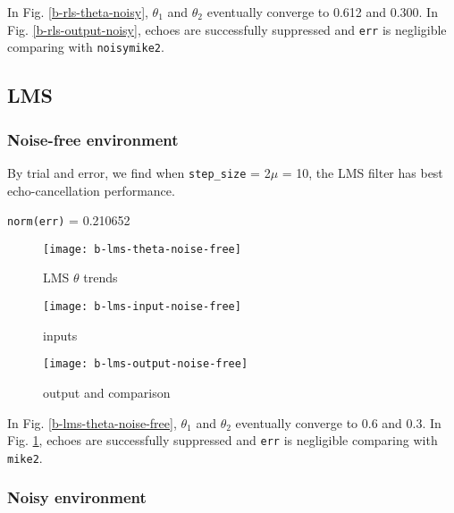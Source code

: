 \documentclass{article}
\begin{document}
In Fig. \ref{b-rls-theta-noisy}, $\theta_1$ and $\theta_2$ eventually converge to 0.612 and 0.300. In Fig. \ref{b-rls-output-noisy}, echoes are successfully suppressed and \texttt{err} is negligible comparing with \texttt{noisymike2}.


\subsection*{LMS}

\subsubsection*{Noise-free environment}

By trial and error, we find when \texttt{step\_size} = 2$\mu$ = 10, the LMS filter has best echo-cancellation performance.
\begin{center}
\texttt{norm(err)} = 0.210652
\end{center}

\begin{figure}[H]
\begin{minipage}[t]{0.33\linewidth}
\centering
\texttt{[image: b-lms-theta-noise-free]}
\caption{LMS $\theta$ trends}
\label{b-lms-theta-noise-free}
\end{minipage}
\begin{minipage}[t]{0.33\linewidth}
\centering
\texttt{[image: b-lms-input-noise-free]}
\caption{inputs}
\end{minipage}
\begin{minipage}[t]{0.33\linewidth}
\centering
\texttt{[image: b-lms-output-noise-free]}
\caption{output and comparison}
\label{b-lms-output-noise-free}
\end{minipage}
\end{figure}

In Fig. \ref{b-lms-theta-noise-free}, $\theta_1$ and $\theta_2$ eventually converge to 0.6 and 0.3. In Fig. \ref{b-lms-output-noise-free}, echoes are successfully suppressed and \texttt{err} is negligible comparing with \texttt{mike2}.


\subsubsection*{Noisy environment}
\end{document}
